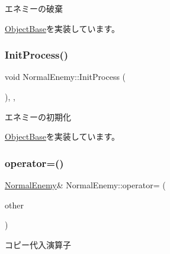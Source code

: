 エネミーの破棄 



\mbox{\hyperlink{class_object_base_a7fa4c548153c3af20f89673ffea809af}{Object\+Base}}を実装しています。

\mbox{\label{class_normal_enemy_ae45bd9535595f810d065b92f8dd63342}} 
\subsubsection{\texorpdfstring{Init\+Process()}{InitProcess()}}
{\footnotesize\ttfamily void Normal\+Enemy\+::\+Init\+Process (\begin{DoxyParamCaption}{ }\end{DoxyParamCaption})\hspace{0.3cm}{\ttfamily [final]}, {\ttfamily [protected]}, {\ttfamily [virtual]}}



エネミーの初期化 



\mbox{\hyperlink{class_object_base_af133f36f2bca1dcfd962e2cfac61ab51}{Object\+Base}}を実装しています。

\mbox{\label{class_normal_enemy_a4294020d85d9ae77a47294e04fd048b6}} 
\subsubsection{\texorpdfstring{operator=()}{operator=()}}
{\footnotesize\ttfamily \mbox{\hyperlink{class_normal_enemy}{Normal\+Enemy}}\& Normal\+Enemy\+::operator= (\begin{DoxyParamCaption}\item[{const \mbox{\hyperlink{class_normal_enemy}{Normal\+Enemy}} \&}]{other }\end{DoxyParamCaption})\hspace{0.3cm}{\ttfamily [inline]}}



コピー代入演算子 

\mbox{\label{class_normal_enemy_a371a6bef4feaeb0b47e1ab61dead7b77}} 
